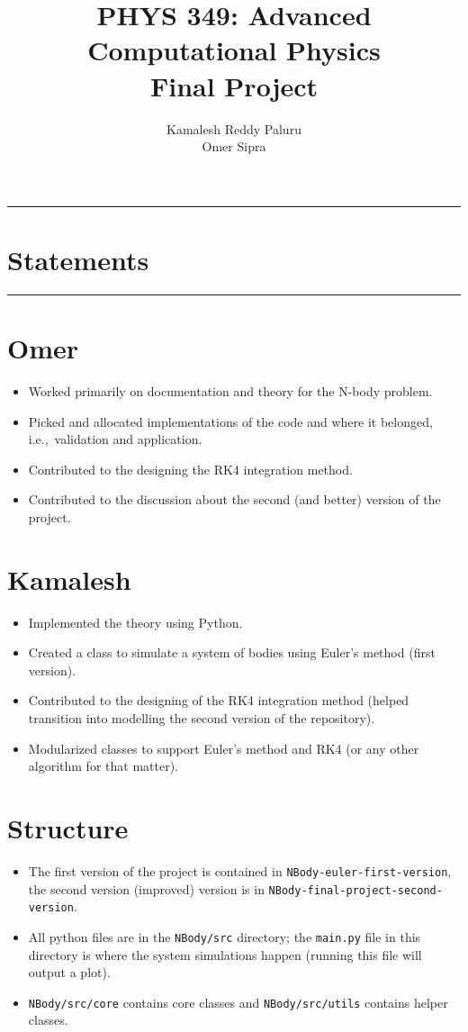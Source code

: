 \documentclass[11pt]{article}
\title{
    PHYS 349: Advanced Computational Physics\\
    \vspace{10pt}
    \textbf{Final Project}\\
}
\author{
    Kamalesh Reddy Paluru\\
    Omer Sipra
}
\newcommand{\psection}[1]{{
    \begin{center}
        \noindent \rule{17cm}{0.4pt}
        \section*{\LARGE #1}
        \noindent \rule{17cm}{0.4pt}
    \end{center}
}}
\newcommand{\psubsection}[1]{{\section*{\LARGE #1}}}
\begin{document}
    \maketitle

    \psection{Statements}

    \psubsection{Omer}
    \begin{itemize}
        \item Worked primarily on documentation and theory for the N-body problem.
        \item Picked and allocated implementations of the code and where it belonged, i.e.,\ validation and application.
        \item Contributed to the designing the RK4 integration method.
        \item Contributed to the discussion about the second (and better) version of the project.
    \end{itemize}

    \psubsection{Kamalesh}
    \begin{itemize}
        \item Implemented the theory using Python.
        \item Created a class to simulate a system of bodies using Euler's method (first version).
        \item Contributed to the designing of the RK4 integration method (helped transition into modelling the second version of the repository).
        \item Modularized classes to support Euler's method and RK4 (or any other algorithm for that matter).
    \end{itemize}
    
    \psubsection{Structure}
    \begin{itemize}
        \item The first version of the project is contained in \texttt{NBody-euler-first-version}, the second version (improved) version is in \texttt{NBody-final-project-second-version}.
        \item All python files are in the \texttt{NBody/src} directory; the \texttt{main.py} file in this directory is where the system simulations happen (running this file will output a plot).
        \item \texttt{NBody/src/core} contains core classes and \texttt{NBody/src/utils} contains helper classes.
    \end{itemize}

    \newpage
    
\end{document}
